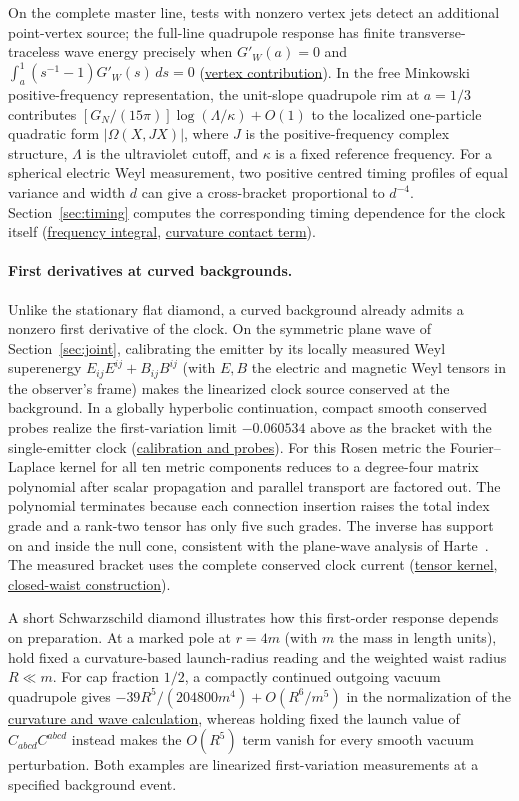 \documentclass[10pt,a4paper]{article}
\numberwithin{equation}{section}
\newcommand{\repo}[2]{\href{https://github.com/sprajs/quantum-gravity/blob/main/#1}{#2}}
\begin{document}
On the complete master line, tests with nonzero vertex jets detect an additional point-vertex source; the full-line quadrupole response has finite transverse-traceless wave energy precisely when $G'_W(a)=0$ and $\int_a^1 (s^{-1}-1)G'_W(s)\,ds=0$ (\repo{audit/weak-normalization.md}{vertex contribution}). In the free Minkowski positive-frequency representation, the unit-slope quadrupole rim at $a=1/3$ contributes $[G_N/(15\pi)]\log(\Lambda/\kappa)+O(1)$ to the localized one-particle quadratic form $|\Omega(X,JX)|$, where $J$ is the positive-frequency complex structure, $\Lambda$ is the ultraviolet cutoff, and $\kappa$ is a fixed reference frequency. For a spherical electric Weyl measurement, two positive centred timing profiles of equal variance and width $d$ can give a cross-bracket proportional to $d^{-4}$. Section~\ref{sec:timing} computes the corresponding timing dependence for the clock itself (\repo{audit/weak-fock.md}{frequency integral}, \repo{audit/weak-domain.md}{curvature contact term}).

\paragraph{First derivatives at curved backgrounds.}
Unlike the stationary flat diamond, a curved background already admits a nonzero first derivative of the clock. On the symmetric plane wave of Section~\ref{sec:joint}, calibrating the emitter by its locally measured Weyl superenergy $E_{ij}E^{ij}+B_{ij}B^{ij}$ (with $E,B$ the electric and magnetic Weyl tensors in the observer's frame) makes the linearized clock source conserved at the background. In a globally hyperbolic continuation, compact smooth conserved probes realize the first-variation limit $-0.060534$ above as the bracket with the single-emitter clock (\repo{audit/weak-curved.md}{calibration and probes}). For this Rosen metric the Fourier--Laplace kernel for all ten metric components reduces to a degree-four matrix polynomial after scalar propagation and parallel transport are factored out. The polynomial terminates because each connection insertion raises the total index grade and a rank-two tensor has only five such grades. The inverse has support on and inside the null cone, consistent with the plane-wave analysis of Harte~\cite{Harte2013}. The measured bracket uses the complete conserved clock current (\repo{audit/weak-rosen-green.md}{tensor kernel}, \repo{audit/weak-curved-closure.md}{closed-waist construction}).

A short Schwarzschild diamond illustrates how this first-order response depends on preparation. At a marked pole at $r=4m$ (with $m$ the mass in length units), hold fixed a curvature-based launch-radius reading and the weighted waist radius $R\ll m$. For cap fraction $1/2$, a compactly continued outgoing vacuum quadrupole gives $-39R^5/(204800m^4)+O(R^6/m^5)$ in the normalization of the \repo{audit/weak-schwarzschild.md}{curvature and wave calculation}, whereas holding fixed the launch value of $C_{abcd}C^{abcd}$ instead makes the $O(R^5)$ term vanish for every smooth vacuum perturbation. Both examples are linearized first-variation measurements at a specified background event.
\end{document}
